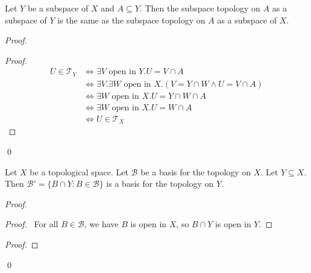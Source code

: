 \begin{prop}
Let $Y$ be a subspace of $X$ and $A \subseteq Y$. Then the subspace topology on $A$ as a subspace of $Y$ is the same as the subspace topology on $A$ as a subspace of $X$.
\end{prop}

\begin{proof}
\pf
{}
\begin{proof}
	\pf
	\begin{align*}
		U \in \mathcal{T}_Y & \Leftrightarrow \exists V \text{ open in } Y. U = V \cap A \\
		& \Leftrightarrow \exists V. \exists W \text{ open in } X. (V = Y \cap W \wedge U = V \cap A) \\
		& \Leftrightarrow \exists W \text{ open in } X. U = Y \cap W \cap A \\
		& \Leftrightarrow \exists W \text{ open in } X. U = W \cap A \\
		& \Leftrightarrow U \in \mathcal{T}_X
	\end{align*}
\end{proof}
\qed
\end{proof}

\begin{prop}
Let $X$ be a topological space. Let $\mathcal{B}$ be a basis for the topology on $X$. Let $Y \subseteq X$. Then $\mathcal{B}' = \{ B \cap Y : B \in \mathcal{B} \}$ is a basis for the topology on $Y$.
\end{prop}

\begin{proof}
\pf
{}
\begin{proof}
	\pf\ For all $B \in \mathcal{B}$, we have $B$ is open in $X$, so $B \cap Y$ is open in $Y$.
\end{proof}
\begin{proof}
\end{proof}
\qed
\end{proof}


